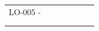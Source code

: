 \begin{landscape}
\begin{table}[]
{\begin{tabular}{lllllll}
LO-005 -                                                                    &                                                                                                                                                                                                                                                                &                                                                                                                                                                                                                                                                &                         &                                                                                                                                                                  &                                                                                                                                                 &                                                                                                                                        \\ \cline{1-3} \cline{5-7}
\multicolumn{7}{l}{}                                                                                                                                                                                                                                                                                                                                                                                                                                                                                                                                                                                                                                                                                                                                                                                                                                                                                                                                                                                                                                                                                  \\
\rowcolor[HTML]{A6A6A6}

\end{tabular}}
\end{table}
\end{landscape}
